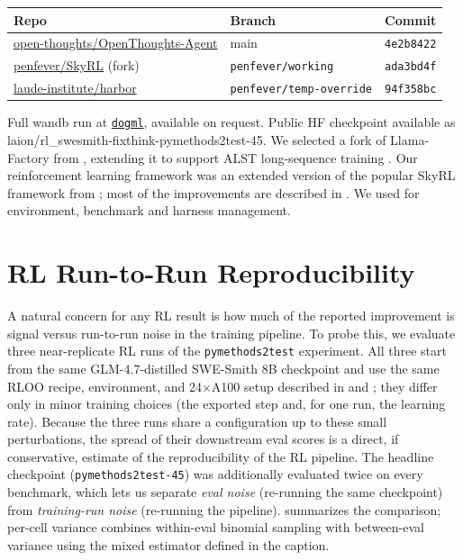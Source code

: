 \documentclass{article}
\begin{document}
\begin{tabular}{lll}
\toprule
Repo & Branch & Commit \\
\midrule
\href{https://github.com/open-thoughts/OpenThoughts-Agent}{open-thoughts/OpenThoughts-Agent} & main                      & \texttt{4e2b8422} \\
\href{https://github.com/penfever/SkyRL}{penfever/SkyRL} (fork)                              & \texttt{penfever/working} & \texttt{ada3bd4f} \\
\href{https://github.com/laude-institute/harbor}{laude-institute/harbor}                    & \texttt{penfever/temp-override} & \texttt{94f358bc} \\
\bottomrule
\end{tabular}

Full wandb run at
\href{https://wandb.ai/dogml/OpenThoughts-Agent/runs/fpqklauc}{\texttt{dogml}}, available on request.
Public HF checkpoint available as laion/rl\_swesmith-fixthink-pymethods2test-45. 
We selected a fork of Llama-Factory from \citep{zheng-etal-2024-llamafactory}, extending it to support ALST long-sequence training \citep{bekman2025arcticlongsequencetraining}. Our reinforcement learning framework was an extended version of the popular SkyRL framework from \citep{griggs2025skrylv01}; most of the improvements are described in \cite{cao2025skyrl}. We used \cite{Harbor_Framework} for environment, benchmark and harness management.

\section{RL Run-to-Run Reproducibility}
\label{app:rl-repro}

A natural concern for any RL result is how much of the reported improvement is signal versus run-to-run noise in the training pipeline. To probe this, we evaluate three near-replicate RL runs of the \texttt{pymethods2test} experiment. All three start from the same GLM-4.7-distilled SWE-Smith 8B checkpoint and use the same RLOO recipe, environment, and 24$\times$A100 setup described in  and ; they differ only in minor training choices (the exported step and, for one run, the learning rate). Because the three runs share a configuration up to these small perturbations, the spread of their downstream eval scores is a direct, if conservative, estimate of the reproducibility of the RL pipeline. The headline checkpoint (\texttt{pymethods2test-45}) was additionally evaluated twice on every benchmark, which lets us separate \emph{eval noise} (re-running the same checkpoint) from \emph{training-run noise} (re-running the pipeline).  summarizes the comparison; per-cell variance combines within-eval binomial sampling with between-eval variance using the mixed estimator defined in the caption.
\end{document}
